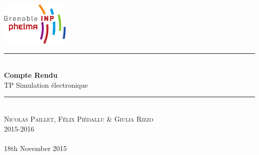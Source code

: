 \begin{titlepage}
    \vspace*{-10px}
    \includegraphics[height=80px]{logo_phelma.pdf}
    \vspace*{-80px}
\begin{flushright}
    \vspace*{60px}
\end{flushright}

\vspace*{0.5cm}
\begin{center}
\rule{\linewidth}{0.5mm}\\[0.4cm]
{\huge{\bfseries Compte Rendu}\\[0.4cm]
TP Simulation électronique\\[0.4cm]}
\rule{\linewidth}{0.5mm}\\[0.5cm]

\LARGE{\textsc{Nicolas Paillet, Félix Piédallu \& Giulia Rizzo}}\\[0.7cm]
\large{\textsc{2015-2016}}\\[2cm]

\Large{~}\\[1cm]

\large{18th November 2015}\\[2cm]


\end{center}
\end{titlepage}

\tableofcontents        %
\newpage
{}  %
